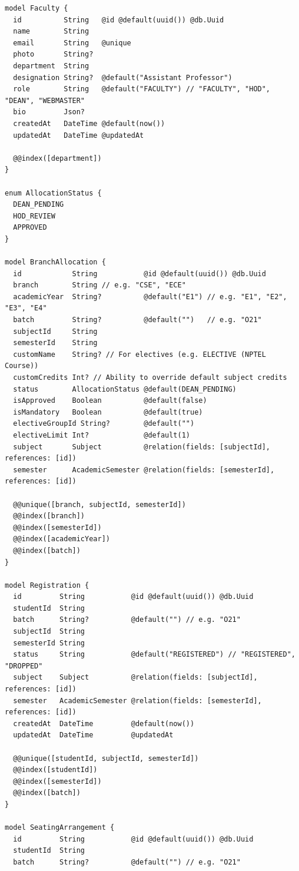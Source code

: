 \documentclass[11pt,a4paper,oneside]{article}
\begin{document}
\begin{lstlisting}
model Faculty {
  id          String   @id @default(uuid()) @db.Uuid
  name        String
  email       String   @unique
  photo       String?
  department  String
  designation String?  @default("Assistant Professor")
  role        String   @default("FACULTY") // "FACULTY", "HOD", "DEAN", "WEBMASTER"
  bio         Json?
  createdAt   DateTime @default(now())
  updatedAt   DateTime @updatedAt

  @@index([department])
}

enum AllocationStatus {
  DEAN_PENDING
  HOD_REVIEW
  APPROVED
}

model BranchAllocation {
  id            String           @id @default(uuid()) @db.Uuid
  branch        String // e.g. "CSE", "ECE"
  academicYear  String?          @default("E1") // e.g. "E1", "E2", "E3", "E4"
  batch         String?          @default("")   // e.g. "O21"
  subjectId     String
  semesterId    String
  customName    String? // For electives (e.g. ELECTIVE (NPTEL Course))
  customCredits Int? // Ability to override default subject credits
  status        AllocationStatus @default(DEAN_PENDING)
  isApproved    Boolean          @default(false)
  isMandatory   Boolean          @default(true)
  electiveGroupId String?        @default("")
  electiveLimit Int?             @default(1)
  subject       Subject          @relation(fields: [subjectId], references: [id])
  semester      AcademicSemester @relation(fields: [semesterId], references: [id])

  @@unique([branch, subjectId, semesterId])
  @@index([branch])
  @@index([semesterId])
  @@index([academicYear])
  @@index([batch])
}

model Registration {
  id         String           @id @default(uuid()) @db.Uuid
  studentId  String
  batch      String?          @default("") // e.g. "O21"
  subjectId  String
  semesterId String
  status     String           @default("REGISTERED") // "REGISTERED", "DROPPED"
  subject    Subject          @relation(fields: [subjectId], references: [id])
  semester   AcademicSemester @relation(fields: [semesterId], references: [id])
  createdAt  DateTime         @default(now())
  updatedAt  DateTime         @updatedAt

  @@unique([studentId, subjectId, semesterId])
  @@index([studentId])
  @@index([semesterId])
  @@index([batch])
}

model SeatingArrangement {
  id         String           @id @default(uuid()) @db.Uuid
  studentId  String
  batch      String?          @default("") // e.g. "O21"

\end{lstlisting}
\end{document}
